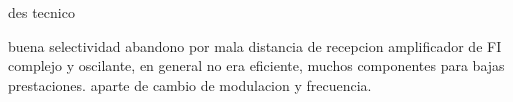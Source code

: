 des tecnico

buena selectividad
abandono por mala distancia de recepcion amplificador de FI complejo y oscilante, en general no era eficiente, muchos componentes para bajas prestaciones. aparte de cambio de modulacion y frecuencia. 
